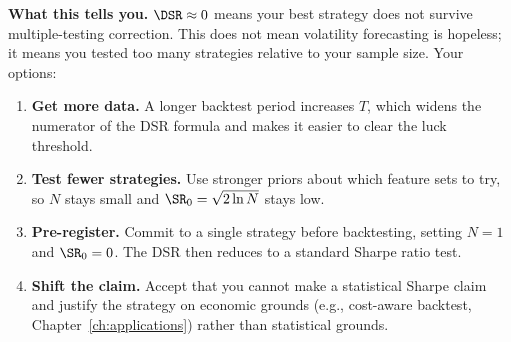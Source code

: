 \begin{workedexample}
\textbf{What this tells you.}
$\DSR \approx 0$ means your best strategy does not survive multiple-testing correction.
This does not mean volatility forecasting is hopeless; it means you tested too many strategies relative to your sample size.
Your options:
\begin{enumerate}[nosep]
  \item \textbf{Get more data.} A longer backtest period increases $T$, which widens the numerator of the DSR formula and makes it easier to clear the luck threshold.
  \item \textbf{Test fewer strategies.} Use stronger priors about which feature sets to try, so $N$ stays small and $\SR_0 = \sqrt{2 \ln N}$ stays low.
  \item \textbf{Pre-register.} Commit to a single strategy before backtesting, setting $N = 1$ and $\SR_0 = 0$. The DSR then reduces to a standard Sharpe ratio test.
  \item \textbf{Shift the claim.} Accept that you cannot make a statistical Sharpe claim and justify the strategy on economic grounds (e.g., cost-aware backtest, Chapter~\ref{ch:applications}) rather than statistical grounds.
\end{enumerate}
\end{workedexample}

